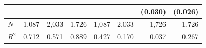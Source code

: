 \begin{tabular}{lrrrrrrr}
                         &                              &                            &                              &                              &                            &                                             (0.030) &                                             (0.026) \\ 
\midrule
$N$                      &                        1,087 &                      2,033 &                        1,726 &                        1,087 &                      2,033 &                                               1,726 &                                               1,726 \\ 
$R^2$                    &                        0.712 &                      0.571 &                        0.889 &                        0.427 &                      0.170 &                                               0.037 &                                               0.267 \\ 
\bottomrule
\end{tabular}
